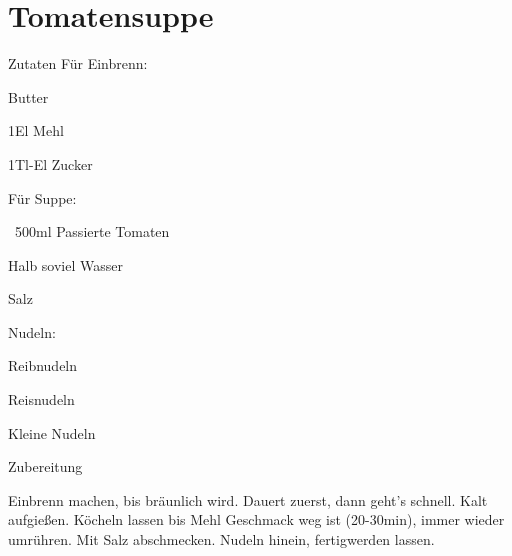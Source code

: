 \chapter*{Tomatensuppe}
\begin{multicols}{2}
 {\Large Zutaten}\newline
 Für Einbrenn:
 \begin{Zutaten}
		\item Butter
		\item 1El Mehl
		\item 1Tl-El Zucker
\end{Zutaten}
Für Suppe:
\begin{Zutaten}
		\item ~500ml Passierte Tomaten
		\item Halb soviel Wasser
		\item Salz
\end{Zutaten}
		Nudeln:
\begin{Zutaten}
		\item Reibnudeln
		\item Reisnudeln
		\item Kleine Nudeln				
		
\end{Zutaten}
\columnbreak
{}
\end{multicols}

{\Large Zubereitung} \newline
\begin{addmargin}[1cm]{0cm}
	Einbrenn machen, bis bräunlich wird. Dauert zuerst, dann geht's schnell.\newline
	Kalt aufgießen.\newline
	Köcheln lassen bis Mehl Geschmack weg ist  (20-30min), immer wieder umrühren.\newline
	Mit Salz abschmecken.\newline
	Nudeln hinein, fertigwerden lassen.
	
	
	
	
	
	
\end{addmargin}

